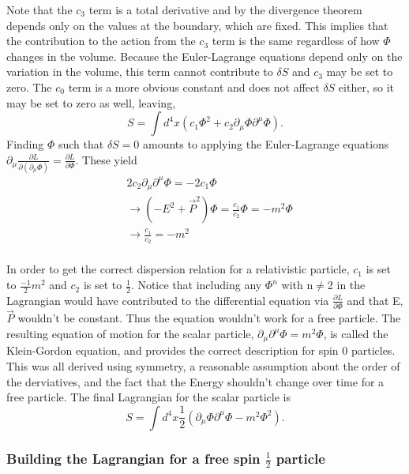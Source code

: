 Note that the $c_3$ term is a total derivative and by the divergence theorem depends only on the values at the boundary, which are fixed. This implies that the contribution to the action from the $c_3$ term is the same regardless of how $\Phi$ changes in the volume. Because the Euler-Lagrange equations depend only on the variation in the volume, this term cannot contribute to $\delta S$ and $c_3$ may be set to zero. The $c_0$ term is a more obvious constant and does not affect $\delta S$ either, so it may be set to zero as well, leaving,  
\begin{equation}
S = \int d^4x \left(c_1 \Phi^2 + c_2 \partial_\mu\Phi\partial^\mu\Phi\right).
\end{equation}
Finding $\Phi$ such that $\delta S = 0$ amounts to applying the Euler-Lagrange equations $\partial_\mu \frac{\partial L}{\partial\left(\partial_\mu\Phi\right)} = \frac{\partial L}{\partial \Phi}$. These yield 
\begin{equation}
\begin{split}
&2c_2\partial_\mu\partial^\mu\Phi = -2c_1\Phi \\ 
&\rightarrow (-E^2 + \vec{P}^2)\Phi = \frac{c_1}{c_2}\Phi = -m^2\Phi \\
&\rightarrow \frac{c_1}{c_2} = -m^2 \\
\end{split}
\end{equation}

In order to get the correct dispersion relation for a relativistic particle, $c_1$ is set to $\frac{-1}{2}m^2$ and $c_2$ is set to $\frac{1}{2}$. Notice that including any $\Phi^n$ with n$\neq$2 in the Lagrangian would have contributed to the differential equation via $\frac{\partial L}{\partial \Phi}$ and that E, $\vec{P}$ wouldn't be constant. Thus the equation wouldn't work for a free particle. The resulting equation of motion for the scalar particle, $\partial_\mu\partial^\mu\Phi = m^2\Phi$, is called the Klein-Gordon equation, and provides the correct description for spin 0 particles. This was all derived using symmetry, a reasonable assumption about the order of the derviatives, and the fact that the Energy shouldn't change over time for a free particle. The final Lagrangian for the scalar particle is 
\begin{equation}
S = \int d^4x \frac{1}{2}\left(\partial_\mu\Phi\partial^\mu\Phi - m^2 \Phi^2 \right).
\end{equation}

\subsubsection{Building the Lagrangian for a free spin $\frac{1}{2}$ particle}

